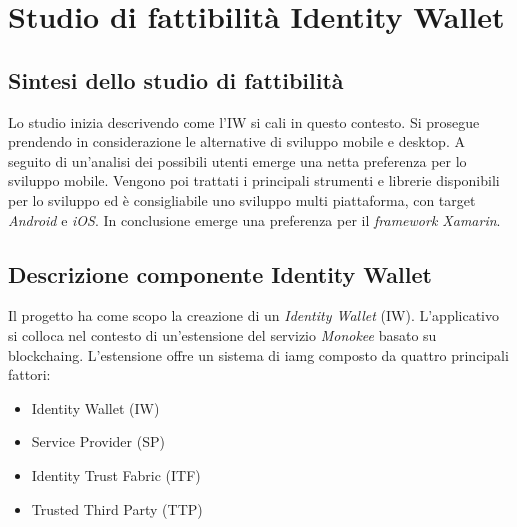 
\section{Studio di fattibilità Identity Wallet}
\subsection{Sintesi dello studio di fattibilità}
Lo studio inizia descrivendo come l’IW si cali in questo contesto. Si prosegue prendendo in considerazione le alternative di sviluppo mobile e desktop. A seguito di un’analisi dei possibili utenti emerge una netta preferenza per lo sviluppo mobile.
Vengono poi trattati i principali strumenti e librerie disponibili per lo sviluppo ed è consigliabile uno sviluppo multi piattaforma, con target \emph{Android} e \emph{iOS}. In conclusione emerge una preferenza per il \emph{framework Xamarin}.
\subsection{Descrizione componente Identity Wallet} 
Il progetto ha come scopo la creazione di un \emph{Identity Wallet} (IW). L’applicativo si colloca nel contesto di un’estensione del servizio \emph{Monokee} basato su \gls{blockchaing}. L’estensione offre un sistema di \gls{iamg} composto da quattro principali fattori:
\begin{itemize}
    \item Identity Wallet (IW)
    \item Service Provider (SP)
    \item Identity Trust Fabric (ITF)
    \item Trusted Third Party (TTP)
\end{itemize}
    
